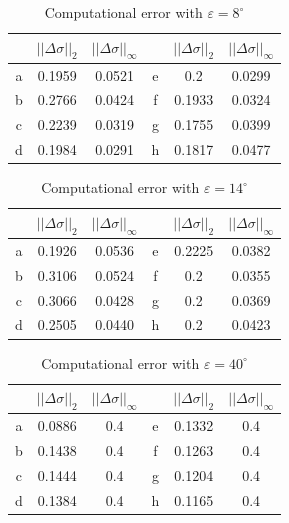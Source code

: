 \documentclass{procDDs}
\begin{document}
\begin{table}[h!]
	\begin{tabular}{|c|c|c||c|c|c|}
		\hline
		& $||\Delta\sigma||_2$ & $||\Delta\sigma||_\infty$ &
		& $||\Delta\sigma||_2$ & $||\Delta\sigma||_\infty$ \\ \hline
		a & 0.1959 & 0.0521 & e &  0.2 & 0.0299\\ \hline
		b & 0.2766 & 0.0424 & f &  0.1933 & 0.0324\\ \hline
		c & 0.2239 & 0.0319 & g &  0.1755 & 0.0399\\ \hline
		d & 0.1984 & 0.0291 & h &  0.1817 & 0.0477\\ \hline
	\end{tabular}
	\label{table:desc4}
	\caption{Computational error with $\varepsilon=8^\circ$}
\end{table}
\begin{table}[h!]
	\begin{tabular}{|c|c|c||c|c|c|}
		\hline
		& $||\Delta\sigma||_2$ & $||\Delta\sigma||_\infty$ &
		& $||\Delta\sigma||_2$ & $||\Delta\sigma||_\infty$ \\ \hline
		a & 0.1926 & 0.0536 & e &  0.2225 & 0.0382\\ \hline
		b & 0.3106 & 0.0524 & f &  0.2 & 0.0355\\ \hline
		c & 0.3066 & 0.0428 & g &  0.2 & 0.0369\\ \hline
		d & 0.2505 & 0.0440 & h &  0.2 & 0.0423\\ \hline
	\end{tabular}
	\label{table:desc5}
	\caption{Computational error with $\varepsilon=14^\circ$}
\end{table}
\begin{table}[h!]
	\begin{tabular}{|c|c|c||c|c|c|}
		\hline
		& $||\Delta\sigma||_2$ & $||\Delta\sigma||_\infty$ &
		& $||\Delta\sigma||_2$ & $||\Delta\sigma||_\infty$ \\ \hline
		a & 0.0886 & 0.4 & e &  0.1332 & 0.4\\ \hline
		b & 0.1438 & 0.4 & f &  0.1263 & 0.4\\ \hline
		c & 0.1444 & 0.4 & g &  0.1204 & 0.4\\ \hline
		d & 0.1384 & 0.4 & h &  0.1165 & 0.4\\ \hline
	\end{tabular}
	\label{table:desc6}
	\caption{Computational error with $\varepsilon=40^\circ$}
\end{table}
\end{document}
